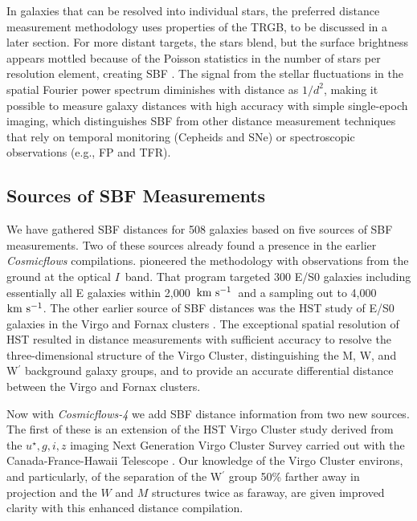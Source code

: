 \documentclass[twocolumn]{aastex63}
\newcommand{\kms}{\mbox{${\rm km~s^{-1}}$}}
\begin{document}
In galaxies that can be resolved into individual stars, the preferred distance measurement  methodology uses properties of the TRGB, to be discussed in a later section.  For more distant targets, the stars blend, but the surface brightness appears mottled because of the Poisson statistics in the number of stars per resolution element, creating SBF \citep{1988AJ.....96..807T}.  The signal from the stellar fluctuations in the spatial Fourier power spectrum diminishes with distance as $1/d^2$, making it possible to measure galaxy distances with high accuracy with simple single-epoch imaging, which distinguishes SBF from other distance measurement techniques that rely on temporal monitoring (Cepheids and SNe) or spectroscopic observations (e.g., FP and TFR).

\subsection{Sources of SBF Measurements}

We have gathered SBF distances for 508 galaxies based on five sources of SBF measurements.  Two of these sources already found a presence in the earlier {\it Cosmicflows} compilations.  \citet{2001ApJ...546..681T} pioneered the methodology with observations from the ground at the optical $I$~band.  That program targeted 300 E/S0 galaxies including essentially all E galaxies within 2,000~\kms\ and a sampling out to 4,000~\kms.  The other earlier source of SBF distances was the HST study of E/S0 galaxies in the Virgo and Fornax clusters \citep{2007ApJ...655..144M, 2009ApJ...694..556B, 2010ApJ...724..657B}.  The exceptional spatial resolution of HST resulted in distance measurements with sufficient accuracy to resolve the three-dimensional structure of the Virgo Cluster, distinguishing the M, W, and W$^{\prime}$ background galaxy groups, and to provide an accurate differential distance between the Virgo and Fornax clusters. 

Now with {\it Cosmicflows-4} we add SBF distance information from two new sources.  The first of these \citep{2018ApJ...856..126C} is an extension of the HST Virgo Cluster study derived from the $u^{\star},g,i,z$ imaging Next Generation Virgo Cluster Survey carried out with the Canada-France-Hawaii Telescope \citep{2012ApJS..200....4F}.  Our knowledge of the Virgo Cluster environs, and particularly, of the separation of the W$^{\prime}$ group 50\% farther away in projection and the $W$ and $M$ structures twice as faraway, are given improved clarity with this enhanced distance compilation.
\end{document}
